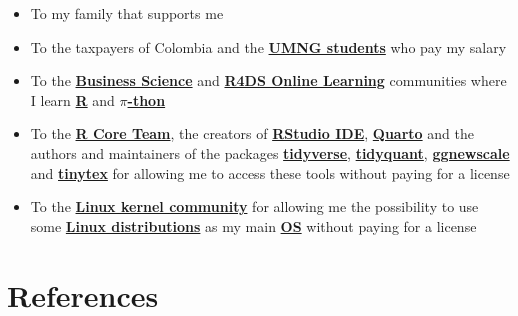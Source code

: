 \documentclass[
  ignorenonframetext,
]{beamer}
\begin{document}
\begin{frame}{}
\label{section-11}
\begin{itemize}
\item
  To my family that supports me
\item
  To the taxpayers of Colombia and the
  \href{https://www.umng.edu.co/estudiante}{\textbf{UMNG students}} who
  pay my salary
\item
  To the \href{https://www.business-science.io/}{\textbf{Business
  Science}} and \href{https://www.rfordatasci.com/}{\textbf{R4DS Online
  Learning}} communities where I learn
  \href{https://www.r-project.org/about.html}{\textbf{R}} and
  \href{https://www.python.org/about/}{\textbf{\(\pi\)-thon}}
\item
  To the \href{https://www.r-project.org/contributors.html}{\textbf{R
  Core Team}}, the creators of
  \href{https://rstudio.com/products/rstudio/}{\textbf{RStudio IDE}},
  \href{https://quarto.org/}{\textbf{Quarto}} and the authors and
  maintainers of the packages
  \href{https://CRAN.R-project.org/package=tidyverse}{\textbf{tidyverse}},
  \href{https://CRAN.R-project.org/package=tidyquant}{\textbf{tidyquant}},
  \href{https://CRAN.R-project.org/package=ggnewscale}{\textbf{ggnewscale}}
  and
  \href{https://CRAN.R-project.org/package=tinytex}{\textbf{tinytex}}
  for allowing me to access these tools without paying for a license
\item
  To the \href{https://www.kernel.org/category/about.html}{\textbf{Linux
  kernel community}} for allowing me the possibility to use some
  \href{https://static.lwn.net/Distributions/}{\textbf{Linux
  distributions}} as my main
  \href{https://en.wikipedia.org/wiki/Operating_system}{\textbf{OS}}
  without paying for a license
\end{itemize}
\end{frame}

\section*{References}\label{references}
\end{document}
